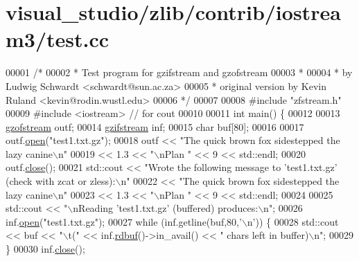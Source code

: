 \hypertarget{visual__studio_2zlib_2contrib_2iostream3_2test_8cc_source}{}\section{visual\+\_\+studio/zlib/contrib/iostream3/test.cc}
\label{visual__studio_2zlib_2contrib_2iostream3_2test_8cc_source}

\begin{DoxyCode}
00001 \textcolor{comment}{/*}
00002 \textcolor{comment}{ * Test program for gzifstream and gzofstream}
00003 \textcolor{comment}{ *}
00004 \textcolor{comment}{ * by Ludwig Schwardt <schwardt@sun.ac.za>}
00005 \textcolor{comment}{ * original version by Kevin Ruland <kevin@rodin.wustl.edu>}
00006 \textcolor{comment}{ */}
00007 
00008 \textcolor{preprocessor}{#include "zfstream.h"}
00009 \textcolor{preprocessor}{#include <iostream>}      \textcolor{comment}{// for cout}
00010 
00011 \textcolor{keywordtype}{int} main() \{
00012 
00013   \hyperlink{classgzofstream}{gzofstream} outf;
00014   \hyperlink{classgzifstream}{gzifstream} inf;
00015   \textcolor{keywordtype}{char} buf[80];
00016 
00017   outf.\hyperlink{classgzofstream_aee3eb31f07eda7f5ad1f60d59ea4b239}{open}(\textcolor{stringliteral}{"test1.txt.gz"});
00018   outf << \textcolor{stringliteral}{"The quick brown fox sidestepped the lazy canine\(\backslash\)n"}
00019        << 1.3 << \textcolor{stringliteral}{"\(\backslash\)nPlan "} << 9 << std::endl;
00020   outf.\hyperlink{classgzofstream_a59e8b01e1c9741085f18ca456c4b8f54}{close}();
00021   std::cout << \textcolor{stringliteral}{"Wrote the following message to 'test1.txt.gz' (check with zcat or zless):\(\backslash\)n"}
00022             << \textcolor{stringliteral}{"The quick brown fox sidestepped the lazy canine\(\backslash\)n"}
00023             << 1.3 << \textcolor{stringliteral}{"\(\backslash\)nPlan "} << 9 << std::endl;
00024 
00025   std::cout << \textcolor{stringliteral}{"\(\backslash\)nReading 'test1.txt.gz' (buffered) produces:\(\backslash\)n"};
00026   inf.\hyperlink{classgzifstream_a8105f9300d36dafbe8b10c204583f5a1}{open}(\textcolor{stringliteral}{"test1.txt.gz"});
00027   \textcolor{keywordflow}{while} (inf.getline(buf,80,\textcolor{charliteral}{'\(\backslash\)n'})) \{
00028     std::cout << buf << \textcolor{stringliteral}{"\(\backslash\)t("} << inf.\hyperlink{classgzifstream_a1c5a0ab4f99f8d8e3406af7bfd82b133}{rdbuf}()->in\_avail() << \textcolor{stringliteral}{" chars left in buffer)\(\backslash\)n"};
00029   \}
00030   inf.\hyperlink{classgzifstream_a073fadd9dc90195c47a6ae2d863c8ace}{close}();

\end{DoxyCode}

